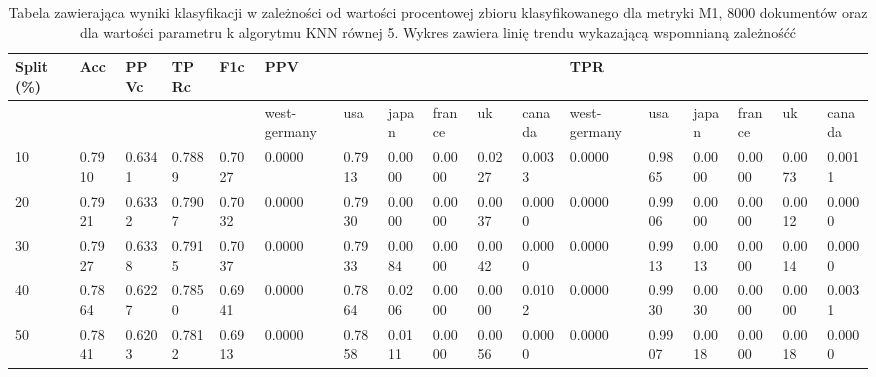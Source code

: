 \documentclass{classrep}
\begin{document}
\begin{table}[!htbp]
    \centering
\caption{Tabela zawierająca wyniki klasyfikacji w zależności od wartości procentowej zbioru klasyfikowanego dla metryki M1, 8000 dokumentów oraz dla wartości parametru k algorytmu KNN równej 5. Wykres zawiera linię trendu wykazającą wspomnianą zależnośćć}
\begin{adjustbox}{max width=\textwidth}
    \begin{tabular}{|l|l|l|l|l|l|l|l|l|l|l|l|l|l|l|l|l|}
    \hline
        Split (\%) & Acc & PPVc & TPRc & F1c & PPV & ~ & ~ & ~ & ~ & ~ & TPR & ~ & ~ & ~ & ~ & ~ \\ \hline
        ~ & ~ & ~ & ~ & ~ & west-germany  & usa  & japan & france & uk & canada & west-germany  & usa  & japan & france & uk & canada \\ \hline
        10 & 0.7910 & 0.6341 & 0.7889 & 0.7027 & 0.0000 & 0.7913 & 0.0000 & 0.0000 & 0.0227 & 0.0033 & 0.0000 & 0.9865 & 0.0000 & 0.0000 & 0.0073 & 0.0011 \\ \hline
        20 & 0.7921 & 0.6332 & 0.7907 & 0.7032 & 0.0000 & 0.7930 & 0.0000 & 0.0000 & 0.0037 & 0.0000 & 0.0000 & 0.9906 & 0.0000 & 0.0000 & 0.0012 & 0.0000 \\ \hline
        30 & 0.7927 & 0.6338 & 0.7915 & 0.7037 & 0.0000 & 0.7933 & 0.0084 & 0.0000 & 0.0042 & 0.0000 & 0.0000 & 0.9913 & 0.0013 & 0.0000 & 0.0014 & 0.0000 \\ \hline
        40 & 0.7864 & 0.6227 & 0.7850 & 0.6941 & 0.0000 & 0.7864 & 0.0206 & 0.0000 & 0.0000 & 0.0102 & 0.0000 & 0.9930 & 0.0030 & 0.0000 & 0.0000 & 0.0031 \\ \hline
        50 & 0.7841 & 0.6203 & 0.7812 & 0.6913 & 0.0000 & 0.7858 & 0.0111 & 0.0000 & 0.0056 & 0.0000 & 0.0000 & 0.9907 & 0.0018 & 0.0000 & 0.0018 & 0.0000 \\ \hline
    \end{tabular}
\end{adjustbox}
\end{table}
\end{document}
